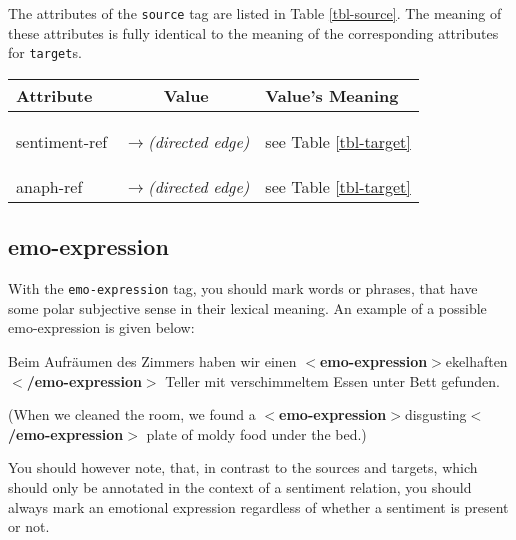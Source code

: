 \documentclass[11pt,a4paper]{article}
\newcommand{\xmltag}[1]{{\textbf{\small$<$#1$>$}}}
\newcommand{\emoexpression}[1]{\xmltag{emo-expression}#1\xmltag{/emo-expression}}
\newlength\clmnwidth
\newenvironment{myexe}{
  \begin{exe}
    \ex\begin{center}
    \itshape
}{
    \end{center}
  \end{exe}
}
\begin{document}
The attributes of the \texttt{source} tag are listed in Table
\ref{tbl-source}.  The meaning of these attributes is fully identical
to the meaning of the corresponding attributes for \texttt{target}s.
\begin{center}
  \begin{tabular}{|l|c|p{\clmnwidth}|}\hline
    Attribute & Value & Value's Meaning\\\hline\label{tbl-source}

    sentiment-ref & \textit{$\longrightarrow$\newline(directed edge)}
    & see Table \ref{tbl-target}\\\hline

    anaph-ref & \textit{$\longrightarrow$\newline(directed edge)} &
    see Table \ref{tbl-target}\\\hline
  \end{tabular}
\end{center}

\subsection{emo-expression}
With the \texttt{emo-expression} tag, you should mark words or
phrases, that have some polar subjective sense in their lexical
meaning.  An example of a possible emo-expression is given below:
\begin{myexe}
  Beim Aufr\"aumen des Zimmers haben wir einen \emoexpression{ekelhaften }
  Teller mit verschimmeltem Essen unter Bett gefunden.

  (When we cleaned the room, we found a \emoexpression{disgusting}
  plate of moldy food under the bed.)
\end{myexe}

You should however note, that, in contrast to the sources and targets, which
should only be annotated in the context of a sentiment relation, you should
always mark an emotional expression regardless of whether a sentiment is
present or not.
\end{document}
